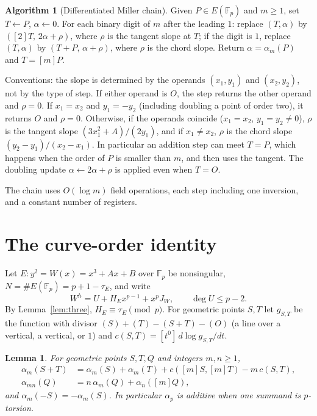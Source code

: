 \documentclass[11pt,a4paper]{article}
\numberwithin{equation}{section}
\theoremstyle{plain}
\newtheorem{lemma}[theorem]{Lemma}
\theoremstyle{definition}
\newtheorem{algorithm}[theorem]{Algorithm}
\newcommand{\F}{\mathbb{F}}
\begin{document}
\begin{algorithm}[Differentiated Miller chain]\label{alg:miller}
Given $P\in E(\F_p)$ and $m\ge1$, set $T\leftarrow P$, $\alpha\leftarrow0$. For each binary digit of $m$ after the leading $1$: replace $(T,\alpha)$ by $([2]T,\,2\alpha+\rho)$, where $\rho$ is the tangent slope at $T$; if the digit is $1$, replace $(T,\alpha)$ by $(T+P,\,\alpha+\rho)$, where $\rho$ is the chord slope. Return $\alpha=\alpha_m(P)$ and $T=[m]P$.

Conventions: the slope is determined by the operands $(x_1,y_1)$ and $(x_2,y_2)$, not by the type of step. If either operand is $O$, the step returns the other operand and $\rho=0$. If $x_1=x_2$ and $y_1=-y_2$ (including doubling a point of order two), it returns $O$ and $\rho=0$. Otherwise, if the operands coincide ($x_1=x_2$, $y_1=y_2\neq0$), $\rho$ is the tangent slope $(3x_1^2+A)/(2y_1)$, and if $x_1\neq x_2$, $\rho$ is the chord slope $(y_2-y_1)/(x_2-x_1)$. In particular an addition step can meet $T=P$, which happens when the order of $P$ is smaller than $m$, and then uses the tangent. The doubling update $\alpha\leftarrow2\alpha+\rho$ is applied even when $T=O$.
\end{algorithm}

The chain uses $O(\log m)$ field operations, each step including one inversion, and a constant number of registers.

\section{The curve-order identity}\label{sec:order}

Let $E:y^2=W(x)=x^3+Ax+B$ over $\F_p$ be nonsingular, $N=\#E(\F_p)=p+1-\tau_E$, and write
\begin{equation}\label{eq:U1}
W^{h}=U+H_Ex^{p-1}+x^pJ_W,\qquad \deg U\le p-2 .
\end{equation}
By Lemma~\ref{lem:three}, $H_E\equiv\tau_E\pmod p$. For geometric points $S,T$ let $g_{S,T}$ be the function with divisor $(S)+(T)-(S+T)-(O)$ (a line over a vertical, a vertical, or $1$) and $c(S,T)=[t^0]\,d\log g_{S,T}/dt$.

\begin{lemma}\label{lem:cocycle}
For geometric points $S,T,Q$ and integers $m,n\ge1$,
\begin{align}
\alpha_m(S+T)&=\alpha_m(S)+\alpha_m(T)+c([m]S,[m]T)-m\,c(S,T),\label{eq:cocycle}\\
\alpha_{mn}(Q)&=n\,\alpha_m(Q)+\alpha_n([m]Q),\label{eq:compose}
\end{align}
and $\alpha_m(-S)=-\alpha_m(S)$. In particular $\alpha_p$ is additive when one summand is $p$-torsion.
\end{lemma}
\end{document}
